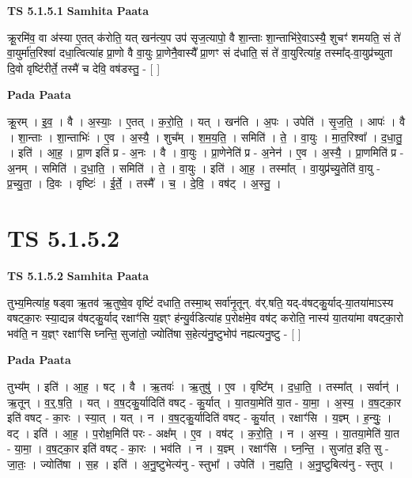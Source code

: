 \documentclass[17pt]{extarticle}
\begin{document}
\textbf{TS 5.1.5.1 } \newline
\textbf{Samhita Paata} \newline

क्रू॒रमि॑व॒ वा अ॑स्या ए॒तत् क॑रोति॒ यत् खन॑त्य॒प उप॑ सृज॒त्यापो॒ वै शा॒न्ताः शा॒न्ताभि॑रे॒वाऽस्यै॒ शुचꣳ॑ शमयति॒ सं ते॑ वा॒युर्मा॑त॒रिश्वा॑ दधा॒त्वित्या॑ह प्रा॒णो वै वा॒युः प्रा॒णेनै॒वास्यै᳚ प्रा॒णꣳ सं द॑धाति॒ सं ते॑ वा॒युरित्या॑ह॒ तस्मा᳚द्-वा॒युप्र॑च्युता दि॒वो वृष्टि॑रीर्ते॒ तस्मै॑ च देवि॒ वष॑डस्तु॒ - [  ] \newline

\textbf{Pada Paata} \newline

क्रू॒रम् । इ॒व॒ । वै । अ॒स्याः॒ । ए॒तत् । क॒रो॒ति॒ । यत् । खन॑ति । अ॒पः । उपेति॑ । सृ॒ज॒ति॒ । आपः॑ । वै । शा॒न्ताः । शा॒न्ताभिः॑ । ए॒व । अ॒स्यै॒ । शुच᳚म् । श॒म॒य॒ति॒ । समिति॑ । ते॒ । वा॒युः । मा॒त॒रिश्वा᳚ । द॒धा॒तु॒ । इति॑ । आ॒ह॒ । प्रा॒ण इति॑ प्र - अ॒नः । वै । वा॒युः । प्रा॒णेनेति॑ प्र - अ॒नेन॑ । ए॒व । अ॒स्यै॒ । प्रा॒णमिति॑ प्र - अ॒नम् । समिति॑ । द॒धा॒ति॒ । समिति॑ । ते॒ । वा॒युः । इति॑ । आ॒ह॒ । तस्मा᳚त् । वा॒युप्र॑च्यु॒तेति॑ वा॒यु - प्र॒च्यु॒ता॒ । दि॒वः । वृष्टिः॑ । ई॒र्ते॒ । तस्मै᳚ । च॒ । दे॒वि॒ । वष॑ट् । अ॒स्तु॒ ।  \newline





\section{ TS 5.1.5.2 }

\textbf{TS 5.1.5.2 } \newline
\textbf{Samhita Paata} \newline

तुभ्य॒मित्या॑ह॒ षड्वा ऋ॒तव॑ ऋ॒तुष्वे॒व वृष्टिं॑ दधाति॒ तस्मा॒थ् सर्वा॑नृ॒तून्. व॑र्.षति॒ यद्-व॑षट्कु॒र्याद्-या॒तया॑माऽस्य वषट्का॒रः स्या॒द्यन्न व॑षट्कु॒र्याद् रक्षाꣳ॑सि य॒ज्ञ्ꣳ ह॑न्यु॒र्वडित्या॑ह प॒रोक्ष॑मे॒व वष॑ट् करोति॒ नास्य॑ या॒तया॑मा वषट्का॒रो भव॑ति॒ न य॒ज्ञ्ꣳ रक्षाꣳ॑सि घ्नन्ति॒ सुजा॑तो॒ ज्योति॑षा स॒हेत्य॑नु॒ष्टुभोप॑ नह्यत्यनु॒ष्टु - [  ] \newline

\textbf{Pada Paata} \newline

तुभ्य᳚म् । इति॑ । आ॒ह॒ । षट् । वै । ऋ॒तवः॑ । ऋ॒तुषु॑ । ए॒व । वृष्टि᳚म् । द॒धा॒ति॒ । तस्मा᳚त् । सर्वान्॑ । ऋ॒तून् । व॒र्॒.ष॒ति॒ । यत् । व॒ष॒ट्कु॒र्यादिति॑ वषट् - कु॒र्यात् । या॒तया॒मेति॑ या॒त - या॒मा॒ । अ॒स्य॒ । व॒ष॒ट्का॒र इति॑ वषट् - का॒रः । स्या॒त् । यत् । न । व॒ष॒ट्कु॒र्यादिति॑ वषट् - कु॒र्यात् । रक्षाꣳ॑सि । य॒ज्ञ्म् । ह॒न्युः॒ । वट् । इति॑ । आ॒ह॒ । प॒रोक्ष॒मिति॑ परः - अक्ष᳚म् । ए॒व । वष॑ट् । क॒रो॒ति॒ । न । अ॒स्य॒ । या॒तया॒मेति॑ या॒त - या॒मा॒ । व॒ष॒ट्का॒र इति॑ वषट् - का॒रः । भव॑ति । न । य॒ज्ञ्म् । रक्षाꣳ॑सि । घ्न॒न्ति॒ । सुजा॑त॒ इति॒ सु - जा॒तः॒ । ज्योति॑षा । स॒ह । इति॑ । अ॒नु॒ष्टुभेत्य॑नु - स्तुभा᳚ । उपेति॑ । न॒ह्य॒ति॒ । अ॒नु॒ष्टुबित्य॑नु - स्तुप् ।  \newline
\end{document}
